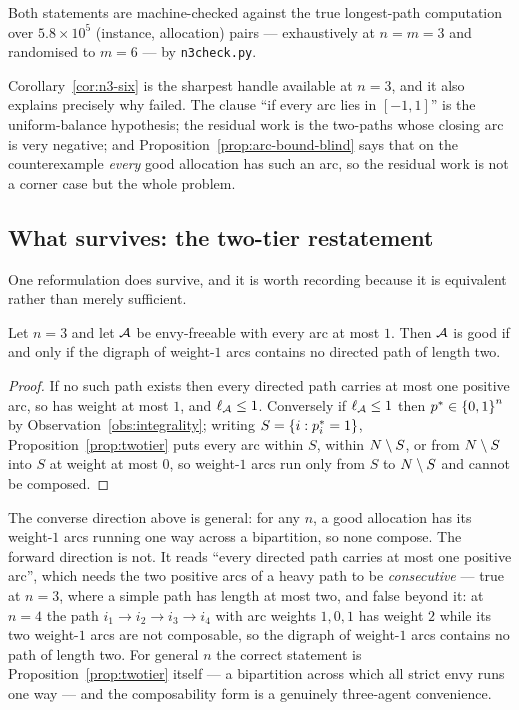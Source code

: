 Both statements are machine-checked against the true longest-path computation
over $5.8 \times 10^{5}$ (instance, allocation) pairs --- exhaustively at
$n = m = 3$ and randomised to $m = 6$ --- by \texttt{n3check.py}.

Corollary~\ref{cor:n3-six} is the sharpest handle available at $n = 3$, and it
also explains precisely why  failed. The clause ``if every
arc lies in $[-1,1]$'' is the uniform-balance hypothesis; the residual work is
the two-paths whose closing arc is very negative; and
Proposition~\ref{prop:arc-bound-blind} says that on the counterexample
\emph{every} good allocation has such an arc, so the residual work is not a
corner case but the whole problem.

\subsection{What survives: the two-tier restatement}

One reformulation does survive, and it is worth recording because it is
equivalent rather than merely sufficient.

\begin{proposition}
\label{prop:twotier-equiv}
Let $n = 3$ and let $\mathcal{A}$ be envy-freeable with every arc at most $1$. Then
$\mathcal{A}$ is good if and only if the digraph of weight-$1$ arcs contains no
directed path of length two.
\end{proposition}

\begin{proof}
If no such path exists then every directed path carries at most one positive
arc, so has weight at most $1$, and $\ell_{\mathcal{A}} \le 1$. Conversely if
$\ell_{\mathcal{A}} \le 1$ then $p^{*} \in \left\{0,1\right\}^n$ by
Observation~\ref{obs:integrality}; writing $S = \left\{i : p^{*}_i = 1\right\}$,
Proposition~\ref{prop:twotier} puts every arc within $S$, within
$N \setminus S$, or from $N \setminus S$ into $S$ at weight at most
$0$, so weight-$1$ arcs run only from $S$ to $N \setminus S$ and cannot be
composed.
\end{proof}

\begin{remark}[The hypothesis $n = 3$ is needed, and only in one direction]
\label{rem:twotier-equiv-scope}
The converse direction above is general: for any $n$, a good allocation has its
weight-$1$ arcs running one way across a bipartition, so none compose. The
forward direction is not. It reads ``every directed path carries at most one
positive arc'', which needs the two positive arcs of a heavy path to be
\emph{consecutive} --- true at $n = 3$, where a simple path has length at most
two, and false beyond it: at $n = 4$ the path $i_1 \to i_2 \to i_3 \to i_4$ with
arc weights $1, 0, 1$ has weight $2$ while its two weight-$1$ arcs are not
composable, so the digraph of weight-$1$ arcs contains no path of length two.
For general $n$ the correct statement is Proposition~\ref{prop:twotier} itself
--- a bipartition across which all strict envy runs one way --- and the
composability form is a genuinely three-agent convenience.
\end{remark}

